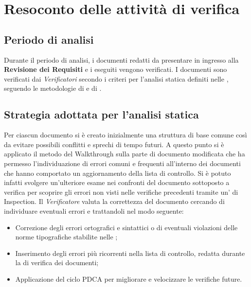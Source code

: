 \section{Resoconto delle attività di verifica}
\label{resoconto}
\subsection{Periodo di analisi}
Durante il periodo di analisi, i documenti redatti da presentare in ingresso alla \textbf{Revisione dei Requisiti} e i  eseguiti vengono verificati. I documenti sono verificati dai \textit{Verificatori} secondo i criteri per l'analisi statica definiti nelle , seguendo le metodologie di  e di .
\subsection{Strategia adottata per l'analisi statica}
Per ciascun documento si è creato inizialmente una struttura di base comune così da evitare possibili conflitti e sprechi di tempo futuri. A questo punto si è applicato il metodo del Walkthrough sulla parte di documento modificata che ha permesso l'individuazione di errori comuni e frequenti all'interno dei documenti che hanno comportato un aggiornamento della lista di controllo. Si è potuto infatti svolgere un’ulteriore esame nei confronti del documento sottoposto a verifica per scoprire gli errori non visti nelle verifiche precedenti tramite un' di Inspection. Il \textit{Verificatore} valuta la correttezza del documento cercando di individuare eventuali errori e trattandoli nel modo seguente:
	\begin{itemize}
		\item Correzione degli errori ortografici e sintattici o di eventuali violazioni delle norme tipografiche stabilite nelle ;
		\item Inserimento degli errori più ricorrenti nella lista di controllo, redatta durante la  di verifica dei documenti;
		\item Applicazione del ciclo PDCA per migliorare e velocizzare le verifiche future.
	\end{itemize}
